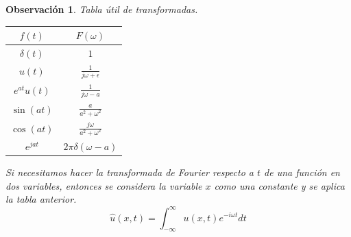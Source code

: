 \documentclass[11pt]{book}
\theoremstyle{plain}
\newtheorem{obs}[proposición]{Observación}
\theoremstyle{definition}
\begin{document}
\begin{obs}
    Tabla útil de transformadas.
\begin{center}
    \begin{tabular}{|c|c|}
        \hline
        \( f(t) \) & \( F(\omega) \) \\
        \hline
        \( \delta(t) \) & \( 1 \) \\
        \hline
        \( u(t) \) & \( \frac{1}{j\omega + \epsilon} \) \\
        \hline
        \( e^{at}u(t) \) & \( \frac{1}{j\omega - a} \) \\
        \hline
        \( \sin(at) \) & \( \frac{a}{a^2 + \omega^2} \) \\
        \hline
        \( \cos(at) \) & \( \frac{j\omega}{a^2 + \omega^2} \) \\
        \hline
        \( e^{jat} \) & \( 2\pi \delta(\omega - a) \) \\
        \hline
    \end{tabular}
\end{center}

Si necesitamos hacer la transformada de Fourier respecto a $t$ de una función en dos variables, entonces se considera la variable $x$ como una constante y se aplica la tabla anterior.
\[
    \hat{u}(x,t) = \int_{-\infty}^{\infty} u(x,t)e^{-i\omega t}dt
\]
\end{obs}
\end{document}

